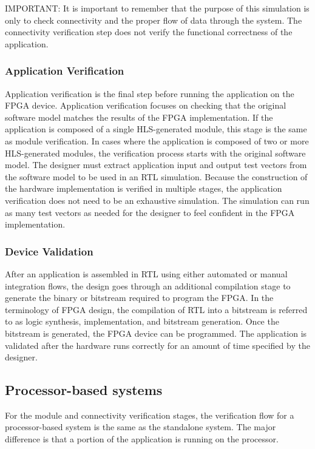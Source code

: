 \begin{highlight}
  IMPORTANT: It is important to remember that the purpose of this simulation is only to check
  connectivity and the proper flow of data through the system. The connectivity verification step does not
  verify the functional correctness of the application.  
\end{highlight}

\subsubsection{Application Verification}
Application verification is the final step before running the application on the FPGA device.
Application verification focuses on checking that the original software model matches the
results of the FPGA implementation. If the application is composed of a single
HLS-generated module, this stage is the same as module verification. In cases where the
application is composed of two or more HLS-generated modules, the verification process
starts with the original software model.
The designer must extract application input and output test vectors from the software
model to be used in an RTL simulation. Because the construction of the hardware
implementation is verified in multiple stages, the application verification does not need to
be an exhaustive simulation. The simulation can run as many test vectors as needed for the
designer to feel confident in the FPGA implementation.

\subsubsection{Device Validation}
After an application is assembled in RTL using either automated or manual integration
flows, the design goes through an additional compilation stage to generate the binary or
bitstream required to program the FPGA. In the terminology of FPGA design, the
compilation of RTL into a bitstream is referred to as logic synthesis, implementation, and
bitstream generation. Once the bitstream is generated, the FPGA device can be
programmed. The application is validated after the hardware runs correctly for an amount
of time specified by the designer.
\clearpage

\subsection{Processor-based systems}
For the module and connectivity verification stages, the verification flow for a
processor-based system is the same as the standalone system. The major difference is that
a portion of the application is running on the processor. 

